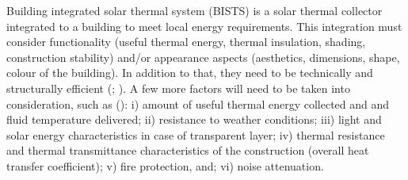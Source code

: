 
Building integrated solar thermal system (BISTS) is a solar thermal collector integrated to a building to meet local energy requirements. This integration must consider functionality (useful thermal energy, thermal insulation, shading, construction stability) and/or appearance aspects (aesthetics, dimensions, shape, colour of the building). In addition to that, they need to be technically and structurally efficient (\cite{Wall2012}; \cite{Buker2015}). A few more factors will need to be taken into consideration, such as (\cite{COSTOffice2015}): i) amount of useful thermal energy collected and and fluid temperature delivered; ii) resistance to weather conditions; iii) light and solar energy characteristics in case of transparent layer; iv) thermal resistance and thermal transmittance characteristics of the construction (overall heat transfer coefficient); v) fire protection, and; vi) noise attenuation.
 





